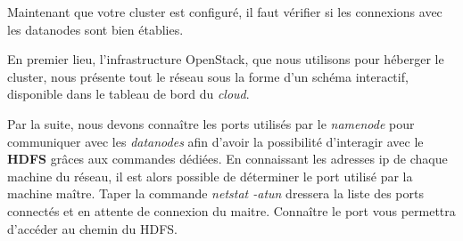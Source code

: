 Maintenant que votre cluster est configuré, il faut vérifier si les connexions avec les datanodes sont bien établies.\par
En premier lieu, l'infrastructure OpenStack, que nous utilisons pour héberger le cluster, nous présente tout le réseau sous la forme d'un schéma interactif, disponible dans le tableau de bord du \textit{cloud}.\par


Par la suite, nous devons connaître les ports utilisés par le \textit{namenode} pour communiquer avec les \textit{datanodes} afin d'avoir la possibilité d’interagir avec le \textbf{HDFS} grâces aux commandes dédiées. En connaissant les adresses ip de chaque machine du réseau, il est alors possible de déterminer le port utilisé par la machine maître. Taper la commande \textit{netstat -atun} dressera la liste des ports connectés et en attente de connexion du maitre. Connaître le port vous permettra d'accéder au chemin du HDFS.

